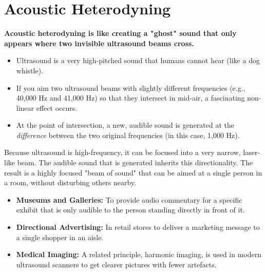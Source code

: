 
\chapter{Acoustic Heterodyning}
\label{ch:acoustic-heterodyning}

\begin{nontechnical}
    \textbf{Acoustic heterodyning is like creating a "ghost" sound that only appears where two invisible ultrasound beams cross.}

    \begin{itemize}
        \item Ultrasound is a very high-pitched sound that humans cannot hear (like a dog whistle).
        \item If you aim two ultrasound beams with slightly different frequencies (e.g., 40,000 Hz and 41,000 Hz) so that they intersect in mid-air, a fascinating non-linear effect occurs.
        \item At the point of intersection, a new, audible sound is generated at the \emph{difference} between the two original frequencies (in this case, 1,000 Hz).
    \end{itemize}

    Because ultrasound is high-frequency, it can be focused into a very narrow, laser-like beam. The audible sound that is generated inherits this directionality. The result is a highly focused "beam of sound" that can be aimed at a single person in a room, without disturbing others nearby.

    \begin{itemize}
        \item \textbf{Museums and Galleries:} To provide audio commentary for a specific exhibit that is only audible to the person standing directly in front of it.
        \item \textbf{Directional Advertising:} In retail stores to deliver a marketing message to a single shopper in an aisle.
        \item \textbf{Medical Imaging:} A related principle, harmonic imaging, is used in modern ultrasound scanners to get clearer pictures with fewer artefacts.
    \end{itemize}
\end{nontechnical}



